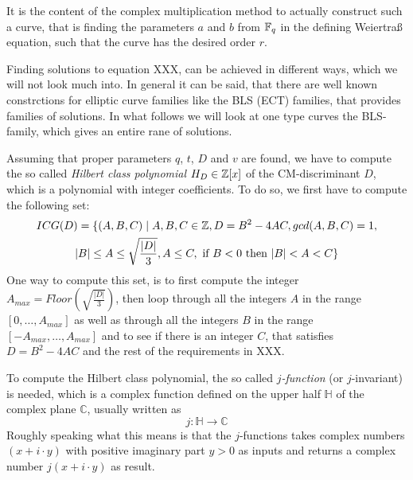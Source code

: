 It is the content of the complex multiplication method to actually construct such a curve, that is finding the parameters $a$ and $b$ from $\mathbb{F}_q$ in the defining Weiertraß equation, such that the curve has the desired order $r$.

Finding solutions to equation XXX, can be achieved in different ways, which we will not look much into. In general it can be said, that there are well known constrctions for elliptic curve families like the BLS (ECT) families, that provides families of solutions. In what follows we will look at one type curves the BLS-family, which gives an entire rane of solutions.

Assuming that proper parameters $q$, $t$, $D$ and $v$ are found, we have to compute the so called \textit{Hilbert class polynomial} $H_D\in \mathbb{Z}[x]$ of the CM-discriminant $D$, which is a polynomial with integer coefficients. To do so, we first have to compute the following set:
\begin{multline*}
ICG(D)=\{(A,B,C)\;|\; A,B,C\in\mathbb{Z}, D = B^2-4AC, gcd(A,B,C)=1, \\
|B|\leq A \leq \sqrt{\frac{|D|}{3}}, A\leq C,
\text{ if } B< 0 \text{ then } |B| < A < C\}
\end{multline*}
One way to compute this set, is to first compute the integer $A_{max}= Floor(\sqrt{\frac{|D|}{3}})$, then loop through all the integers $A$ in the range $[0,\ldots,A_{max}]$ as well as through all the integers $B$ in the range $[-A_{max},\ldots,A_{max}]$ and to see if there is an integer $C$, that satisfies $D = B^2-4AC$ and the rest of the requirements in XXX.

To compute the Hilbert class polynomial, the so called \textit{$j$-function} (or $j$-invariant) is needed, which is a complex function defined on the upper half $\mathbb{H}$ of the complex plane $\mathbb{C}$, usually written as
\begin{equation}
j: \mathbb{H} \to \mathbb{C}
\end{equation}
Roughly speaking what this means is that the $j$-functions takes complex numbers
$(x +i\cdot y)$ with positive imaginary part $y>0$ as inputs and returns a complex number $j(x+i\cdot y)$ as result.

